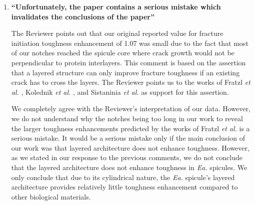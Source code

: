 \documentclass[11pt,letterpaper]{report}
\makeatletter
\newcommand{\EA}{\textit{Ea.\@}\xspace}
\makeatother
\begin{document}
\begin{enumerate}[label=\textit{1.\arabic*},wide, labelwidth=!, labelindent=0pt]
Our conclusion was that the observed enhancements were not as remarkable as those observed in prototypically tough biological materials. For example, the enhancement of initiation toughness and average crack growth resistance for nacre are, respectively, $\approx$196 and $\approx$150 (see Figure 8 (A), either in the original or revised manuscript).

We have consequently made two changes, which are listed as \ref{Mc01} and \ref{Mc02} in the \textit{LoC} to clarify our findings.
%
Through change \ref{Mc01} we have modified the abstract to include the magnitude of the toughness enhancements that we observed in the \EA spicules.
%
Through change \ref{Mc02} we have added a paragraph in the introduction to clarify that we did measure up to a ten fold increase in fracture initiation toughness but that this increase is small compared to the increases observed, for example, in nacre.


\item \label{r1c1b} {\bf ``Unfortunately, the paper contains a serious mistake which invalidates the conclusions of the paper''}

The Reviewer points out that our original reported value for fracture initiation toughness enhancement of 1.07 was small due to the fact that most of our notches reached the spicule core where crack growth would not be perpendicular to protein interlayers. This comment is based on the assertion that a layered structure can only improve fracture toughness if an existing crack has to cross the layers. The Reviewer points us to the works of Fratzl \textit{et al.} \cite{fratzl2007hindered}, Kolednik \textit{et al.} \cite{kolednik2011bioinspired}, and Sistaninia \textit{et al.} \cite{sistaninia2018design} as support for this assertion. 

We completely agree with the Reviewer's interpretation of our data. However, we do not understand why the notches being too long in our work to reveal the larger toughness enhancements predicted by the works of Fratzl \textit{et al.} is a serious mistake. It would be a serious mistake only if the main conclusion of our work was that layered architecture does not enhance toughness. However, as we stated in our response to the previous comments, we do not conclude that the layered architecture does not enhance toughness in \EA spicules.  We only conclude that due to its cylindrical nature, the \EA spicule's layered architecture provides relatively little toughness enhancement compared to other biological materials. 



\end{enumerate}
\end{document}
